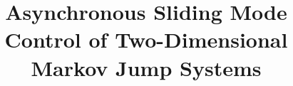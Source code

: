 \documentclass[conference]{IEEEtran}
\begin{document}
%
\title{Asynchronous Sliding Mode Control of Two-Dimensional Markov Jump Systems}




% 
\end{document}
